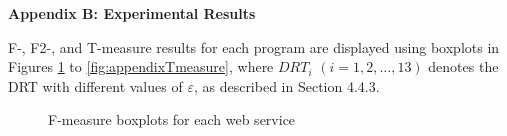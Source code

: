\documentclass[10pt,journal,cspaper,compsoc,onecolumn]{IEEEtran}
\begin{document}
\large{\textbf{Appendix B: Experimental Results}}

F-, F2-, and T-measure results for each program are displayed using boxplots in Figures \ref{fig:appendixFmeasure} to \ref{fig:appendixTmeasure}, where $DRT_i$ $(i = 1,2, \ldots, 13)$ denotes the DRT with different values of $\varepsilon$, as described in Section 4.4.3.

\begin{figure}[h]
	\centering
	\caption{F-measure boxplots for each web service}
	\label{fig:appendixFmeasure}
\end{figure}
\end{document}
